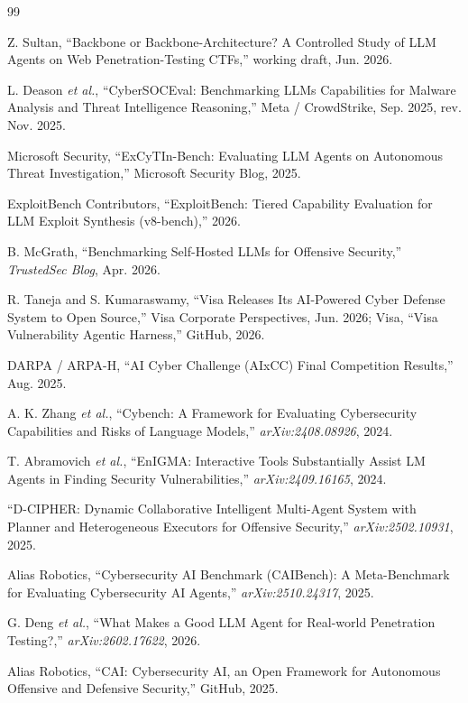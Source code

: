 \documentclass[10pt,twocolumn]{article}
\begin{document}
\begin{thebibliography}{99}

 Z. Sultan, ``Backbone or Backbone-Architecture? A
Controlled Study of LLM Agents on Web Penetration-Testing CTFs,''
working draft, Jun. 2026.

 L. Deason \textit{et al.}, ``CyberSOCEval:
Benchmarking LLMs Capabilities for Malware Analysis and Threat
Intelligence Reasoning,'' Meta / CrowdStrike, Sep. 2025, rev. Nov. 2025.

 Microsoft Security, ``ExCyTIn-Bench: Evaluating
LLM Agents on Autonomous Threat Investigation,'' Microsoft Security
Blog, 2025.

 ExploitBench Contributors, ``ExploitBench:
Tiered Capability Evaluation for LLM Exploit Synthesis (v8-bench),''
2026.

 B. McGrath, ``Benchmarking Self-Hosted LLMs for
Offensive Security,'' \textit{TrustedSec Blog}, Apr. 2026.

 R. Taneja and S. Kumaraswamy, ``Visa Releases Its
AI-Powered Cyber Defense System to Open Source,'' Visa Corporate
Perspectives, Jun. 2026; Visa, ``Visa Vulnerability Agentic Harness,''
GitHub, 2026.

 DARPA / ARPA-H, ``AI Cyber Challenge (AIxCC) Final
Competition Results,'' Aug. 2025.

 A. K. Zhang \textit{et al.}, ``Cybench: A
Framework for Evaluating Cybersecurity Capabilities and Risks of
Language Models,'' \textit{arXiv:2408.08926}, 2024.

 T. Abramovich \textit{et al.}, ``EnIGMA:
Interactive Tools Substantially Assist LM Agents in Finding Security
Vulnerabilities,'' \textit{arXiv:2409.16165}, 2024.

 ``D-CIPHER: Dynamic Collaborative Intelligent
Multi-Agent System with Planner and Heterogeneous Executors for
Offensive Security,'' \textit{arXiv:2502.10931}, 2025.

 Alias Robotics, ``Cybersecurity AI Benchmark
(CAIBench): A Meta-Benchmark for Evaluating Cybersecurity AI Agents,''
\textit{arXiv:2510.24317}, 2025.

 G. Deng \textit{et al.}, ``What Makes a Good
LLM Agent for Real-world Penetration Testing?,'' \textit{arXiv:2602.17622},
2026.

 Alias Robotics, ``CAI: Cybersecurity AI, an Open
Framework for Autonomous Offensive and Defensive Security,'' GitHub,
2025.


\end{thebibliography}
\end{document}
